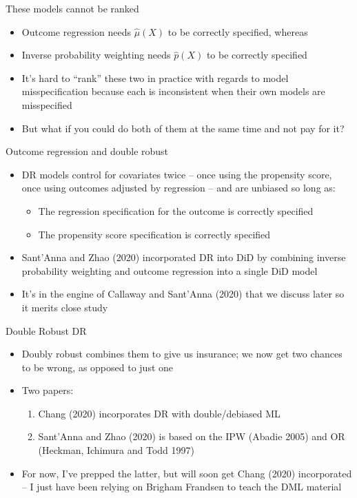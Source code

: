 \documentclass{beamer}
\begin{document}
\begin{frame}{These models cannot be ranked}

\begin{itemize}
\item Outcome regression needs $\widehat{\mu}(X)$ to be correctly specified, whereas
\item Inverse probability weighting needs $\widehat{p}(X)$ to be correctly specified
\item It's hard to ``rank'' these two in practice with regards to model misspecification because each is inconsistent when their own models are misspecified
\item But what if you could do both of them at the same time and not pay for it?
\end{itemize}

\end{frame}

\begin{frame}{Outcome regression and double robust}

\begin{itemize}
\item DR models control for covariates twice -- once using the propensity score, once using outcomes adjusted by regression -- and are unbiased so long as:
	\begin{itemize}
	\item The regression specification for the outcome is correctly specified
	\item The propensity score specification is correctly specified
	\end{itemize}
\item Sant'Anna and Zhao (2020) incorporated DR into DiD by combining inverse probability weighting and outcome regression into a single DiD model
\item It's in the engine of Callaway and Sant'Anna (2020) that we discuss later so it merits close study
\end{itemize}

\end{frame}



\begin{frame}{Double Robust DR}

\begin{itemize}
\item Doubly robust combines them to give us insurance; we now get two chances to be wrong, as opposed to just one
\item Two papers:
	\begin{enumerate}
	\item Chang (2020) incorporates DR with double/debiased ML
	\item Sant'Anna and Zhao (2020) is based on the IPW (Abadie 2005) and OR (Heckman, Ichimura and Todd 1997)
	\end{enumerate}
\item For now, I've prepped the latter, but will soon get Chang (2020) incorporated -- I just have been relying on Brigham Frandsen to teach the DML material
\end{itemize}

\end{frame}
\end{document}
